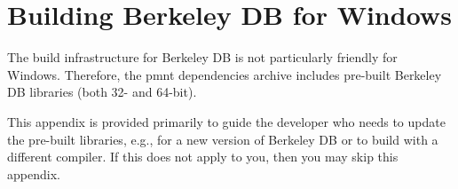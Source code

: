 
\chapter{Building Berkeley DB for Windows}
\label{chapter-building-bdb-for-windows}

The build infrastructure for Berkeley DB is not particularly friendly for Windows.  Therefore, the \ac{pmnt} dependencies archive includes pre-built Berkeley DB libraries (both 32- and 64-bit).

This appendix is provided primarily to guide the developer who needs to update the pre-built libraries, e.g., for a new version of Berkeley DB or to build with a different compiler.  If this does not apply to you, then you may skip this appendix.

